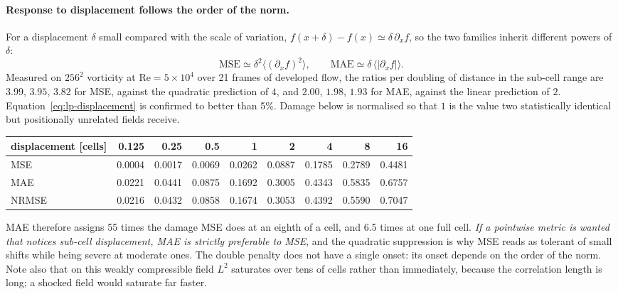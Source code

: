 \documentclass[11pt]{article}
\begin{document}
\paragraph{Response to displacement follows the order of the norm.} For a displacement
$\delta$ small compared with the scale of variation, $f(x+\delta) - f(x) \simeq
\delta\,\partial_x f$, so the two families inherit different powers of $\delta$:
\begin{equation}
\mathrm{MSE} \simeq \delta^{2}\bigl\langle (\partial_x f)^2 \bigr\rangle,
\qquad
\mathrm{MAE} \simeq \delta\,\bigl\langle |\partial_x f| \bigr\rangle .
\label{eq:lp-displacement}
\end{equation}
Measured on $256^2$ vorticity at $\mathrm{Re} = 5\times10^4$ over 21 frames of developed
flow, the ratios per doubling of distance in the sub-cell range are $3.99$, $3.95$, $3.82$
for MSE, against the quadratic prediction of $4$, and $2.00$, $1.98$, $1.93$ for MAE,
against the linear prediction of $2$. Equation~\eqref{eq:lp-displacement} is confirmed to
better than 5\%. Damage below is normalised so that $1$ is the value two statistically
identical but positionally unrelated fields receive.

\begin{center}
\begin{tabular}{@{}lrrrrrrrr@{}}
\toprule
displacement [cells] & 0.125 & 0.25 & 0.5 & 1 & 2 & 4 & 8 & 16 \\
\midrule
MSE   & 0.0004 & 0.0017 & 0.0069 & 0.0262 & 0.0887 & 0.1785 & 0.2789 & 0.4481 \\
MAE   & 0.0221 & 0.0441 & 0.0875 & 0.1692 & 0.3005 & 0.4343 & 0.5835 & 0.6757 \\
NRMSE & 0.0216 & 0.0432 & 0.0858 & 0.1674 & 0.3053 & 0.4392 & 0.5590 & 0.7047 \\
\bottomrule
\end{tabular}
\end{center}

\noindent
MAE therefore assigns 55 times the damage MSE does at an eighth of a cell, and 6.5 times at
one full cell. \emph{If a pointwise metric is wanted that notices sub-cell displacement, MAE
is strictly preferable to MSE}, and the quadratic suppression is why MSE reads as tolerant
of small shifts while being severe at moderate ones. The double penalty does not have a
single onset: its onset depends on the order of the norm. Note also that on this
weakly compressible field $L^2$ saturates over tens of cells rather than immediately,
because the correlation length is long; a shocked field would saturate far faster.
\end{document}
